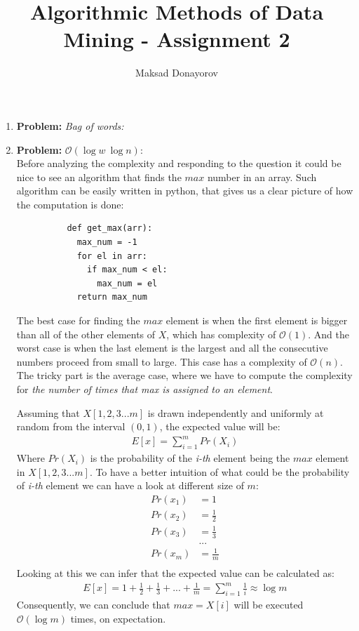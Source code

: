\documentclass[11pt,a4paper,english]{article}
\title{Algorithmic Methods of Data Mining - Assignment 2}
\author{Maksad Donayorov}
\begin{document}
    \maketitle

    \begin{enumerate}
      \item \textbf{Problem:} \textit{Bag of words:}

      \item \textbf{Problem:} $\mathcal{O}(\log{w}\ \log{n})$: \\
        Before analyzing the complexity and responding to the question it could be nice to see an algorithm that finds the $max$ number in an array. Such algorithm can be easily written in python, that gives us a clear picture of how the computation is done:
        \begin{verbatim}
          def get_max(arr):
            max_num = -1
            for el in arr:
              if max_num < el:
                max_num = el
            return max_num
        \end{verbatim}

        The best case for finding the $max$ element is when the first element is bigger than all of the other elements of $X$, which has complexity of $\mathcal{O}(1)$. And the worst case is when the last element is the largest and all the consecutive numbers proceed from small to large. This case has a complexity of $\mathcal{O}(n)$. The tricky part is the average case, where we have to compute the complexity for \textit{the number of times that max is assigned to an element}.

        Assuming that $X[1,2,3...m]$ is drawn independently and uniformly at random from the interval $(0,1)$, the expected value will be:
        \begin{align*}
          E[x] = \sum\limits_{i=1}^{m} Pr(X_i)
        \end{align*}
        Where $Pr(X_i)$ is the probability of the \textit{i-th} element being the $max$ element in $X[1,2,3...m]$. To have a better intuition of what could be the probability of \textit{i-th} element we can have a look at different size of $m$:
        \begin{align*}
          Pr(x_1) & = 1 \\
          Pr(x_2) & = \frac{1}{2} \\
          Pr(x_3) & = \frac{1}{3} \\
                  & ... \\
          Pr(x_m) & = \frac{1}{m} \\
        \end{align*}
        Looking at this we can infer that the expected value can be calculated as:
        \begin{align*}
          E[x] = 1 + \frac{1}{2} + \frac{1}{3} + ... + \frac{1}{m} = \sum\limits_{i=1}^{m}{\frac{1}{i}} \approx \log{m}
        \end{align*}
        Consequently, we can conclude that $max = X[i]$ will be executed $\mathcal{O}(\log m)$ times, on expectation.


\end{enumerate}
\end{document}
